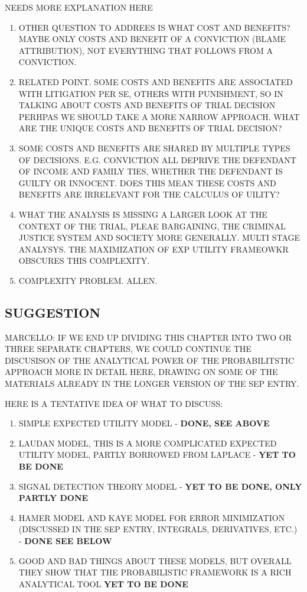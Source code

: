 \documentclass[10pt,dvipsnames,enabledeprecatedfontcommands]{scrartcl}
\begin{document}
NEEDS MORE EXPLANATION HERE

\begin{enumerate}
\def\labelenumi{\arabic{enumi})}
\item
  OTHER QUESTION TO ADDREES IS WHAT COST AND BENEFITS? MAYBE ONLY COSTS
  AND BENEFIT OF A CONVICTION (BLAME ATTRIBUTION), NOT EVERYTHING THAT
  FOLLOWS FROM A CONVICTION.
\item
  RELATED POINT. SOME COSTS AND BENEFITS ARE ASSOCIATED WITH LITIGATION
  PER SE, OTHERS WITH PUNISHMENT, SO IN TALKING ABOUT COSTS AND BENEFITS
  OF TRIAL DECISION PERHPAS WE SHOULD TAKE A MORE NARROW APPROACH. WHAT
  ARE THE UNIQUE COSTS AND BENEFITS OF TRIAL DECISION?
\item
  SOME COSTS AND BENEFITS ARE SHARED BY MULTIPLE TYPES OF DECISIONS.
  E.G. CONVICTION ALL DEPRIVE THE DEFENDANT OF INCOME AND FAMILY TIES,
  WHETHER THE DEFENDANT IS GUILTY OR INNOCENT. DOES THIS MEAN THESE
  COSTS AND BENEFITS ARE IRRELEVANT FOR THE CALCULUS OF UILITY?
\item
  WHAT THE ANALYSIS IS MISSING A LARGER LOOK AT THE CONTEXT OF THE
  TRIAL, PLEAE BARGAINING, THE CRIMINAL JUSTICE SYSTEM AND SOCIETY MORE
  GENERALLY. MULTI STAGE ANALYSYS. THE MAXIMIZATION OF EXP UTILITY
  FRAMEOWKR OBSCURES THIS COMPLEXITY.
\item
  COMPLEXITY PROBLEM. ALLEN.
\end{enumerate}

\subsection{SUGGESTION}

MARCELLO: IF WE END UP DIVIDING THIS CHAPTER INTO TWO OR THREE SEPARATE
CHAPTERS, WE COULD CONTINUE THE DISCUSISON OF THE ANALYTICAL POWER OF
THE PROBABILITSTIC APPROACH MORE IN DETAIL HERE, DRAWING ON SOME OF THE
MATERIALS ALREADY IN THE LONGER VERSION OF THE SEP ENTRY.

HERE IS A TENTATIVE IDEA OF WHAT TO DISCUSS:

\begin{enumerate}
\def\labelenumi{(\arabic{enumi})}
\item
  SIMPLE EXPECTED UTILITY MODEL - \textbf{DONE, SEE ABOVE}
\item
  LAUDAN MODEL, THIS IS A MORE COMPLICATED EXPECTED UTILITY MODEL,
  PARTLY BORROWED FROM LAPLACE - \textbf{YET TO BE DONE}
\item
  SIGNAL DETECTION THEORY MODEL -
  \textbf{YET TO BE DONE, ONLY PARTLY DONE}
\item
  HAMER MODEL AND KAYE MODEL FOR ERROR MINIMIZATION (DISCUSSED IN THE
  SEP ENTRY, INTEGRALS, DERIVATIVES, ETC.) - \textbf{DONE SEE BELOW}
\item
  GOOD AND BAD THINGS ABOUT THESE MODELS, BUT OVERALL THEY SHOW THAT THE
  PROBABILISTIC FRAMEWORK IS A RICH ANALYTICAL TOOL
  \textbf{YET TO BE DONE}
\end{enumerate}
\end{document}
